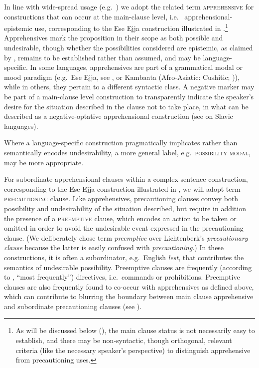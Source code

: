 \documentclass[output=paper,colorlinks,citecolor=brown
]{langscibook}
\begin{document}
In line with wide-spread usage (e.g.\ \cite{Dobrushina2006,pakendorfschalley2007,angeloschultzeberndt2016,vuillermet2018a}) we adopt the related term \textsc{apprehensive} for constructions that can occur at the main-clause level, i.e.\  apprehensional-epistemic use, corresponding to the Ese Ejja construction illustrated in .\footnote{As will be discussed below (), the main clause status is not necessarily easy to establish, and there may be non-syntactic, though orthogonal, relevant criteria (like the necessary speaker's perspective) to distinguish apprehensive from precautioning uses.} Apprehensives mark the proposition in their scope as both possible and undesirable, though whether the possibilities considered are epistemic, as claimed by \citet{lichtenberk1995}, remains to be established rather than assumed, and may be language-specific. In some languages, apprehensives are part of a grammatical modal or mood paradigm (e.g.\  Ese Ejja, see , or Kambaata (Afro-Asiatic: Cushitic; \citealt{chapters/treis})), while in others, they pertain to a different syntactic class. A negative marker may be part of a main-clause level construction to transparently indicate the speaker's desire for the situation described in the clause not to take place, in what can be described as a negative-optative apprehensional construction (see \citealt{chapters/wiemer} on Slavic languages).

Where a language-specific construction pragmatically implicates rather than semantically encodes undesirability, a more general label, e.g.\ \textsc{possibility modal}, may be more appropriate.

For subordinate apprehensional clauses within a complex sentence construction, corresponding to the Ese Ejja construction illustrated in , we will adopt   term \textsc{precautioning} clause. Like apprehensives, precautioning clauses convey both possibility and undesirability of the situation described, but require in addition the presence of a \textsc{preemptive} clause, which encodes an action to be taken or omitted in order to avoid the undesirable event expressed in the precautioning clause. (We deliberately chose  term \textit{preemptive} over Lichtenberk's \textit{precautionary clause} because the latter is easily confused with \textit{precautioning}.) In these constructions, it is often a subordinator, e.g.\ English \textit{lest}, that contributes the semantics of undesirable possibility. Preemptive clauses are frequently (according to \citet[24]{dixon2009}, ``most frequently'') directives, i.e.\ commands or prohibitions. Preemptive clauses are also frequently found to co-occur with apprehensives as defined above, which can contribute to blurring the boundary between main clause apprehensive and subordinate precautioning clauses (see ).
\end{document}
